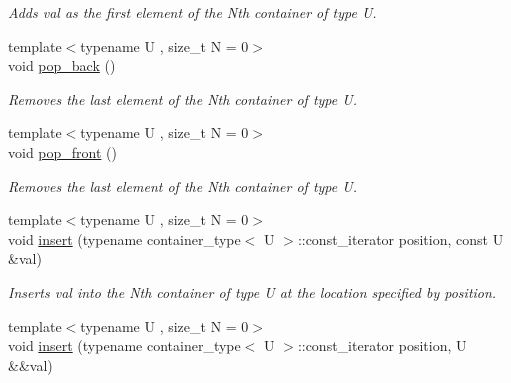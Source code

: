 \begin{DoxyCompactItemize}
\begin{DoxyCompactList}\small\item\em Adds val as the first element of the Nth container of type U. \end{DoxyCompactList}\item 
\hypertarget{classheterogeneous_1_1heterolist_3_01_t_00_01_types_8_8_8_4_aa08710185e3762e68d330735b3f35ae5}{}{\footnotesize template$<$typename U , size\+\_\+t N = 0$>$ }\\void \hyperlink{classheterogeneous_1_1heterolist_3_01_t_00_01_types_8_8_8_4_aa08710185e3762e68d330735b3f35ae5}{pop\+\_\+back} ()\label{classheterogeneous_1_1heterolist_3_01_t_00_01_types_8_8_8_4_aa08710185e3762e68d330735b3f35ae5}

\begin{DoxyCompactList}\small\item\em Removes the last element of the Nth container of type U. \end{DoxyCompactList}\item 
\hypertarget{classheterogeneous_1_1heterolist_3_01_t_00_01_types_8_8_8_4_a237f3d83ea3ac5a1bd5dcedbd2d6f789}{}{\footnotesize template$<$typename U , size\+\_\+t N = 0$>$ }\\void \hyperlink{classheterogeneous_1_1heterolist_3_01_t_00_01_types_8_8_8_4_a237f3d83ea3ac5a1bd5dcedbd2d6f789}{pop\+\_\+front} ()\label{classheterogeneous_1_1heterolist_3_01_t_00_01_types_8_8_8_4_a237f3d83ea3ac5a1bd5dcedbd2d6f789}

\begin{DoxyCompactList}\small\item\em Removes the last element of the Nth container of type U. \end{DoxyCompactList}\item 
\hypertarget{classheterogeneous_1_1heterolist_3_01_t_00_01_types_8_8_8_4_a7cb358ece628bdb513c3e768ff1d1822}{}{\footnotesize template$<$typename U , size\+\_\+t N = 0$>$ }\\void \hyperlink{classheterogeneous_1_1heterolist_3_01_t_00_01_types_8_8_8_4_a7cb358ece628bdb513c3e768ff1d1822}{insert} (typename container\+\_\+type$<$ U $>$\+::const\+\_\+iterator position, const U \&val)\label{classheterogeneous_1_1heterolist_3_01_t_00_01_types_8_8_8_4_a7cb358ece628bdb513c3e768ff1d1822}

\begin{DoxyCompactList}\small\item\em Inserts val into the Nth container of type U at the location specified by position. \end{DoxyCompactList}\item 
\hypertarget{classheterogeneous_1_1heterolist_3_01_t_00_01_types_8_8_8_4_abffd0f84e0855b83c8272335e6267511}{}{\footnotesize template$<$typename U , size\+\_\+t N = 0$>$ }\\void \hyperlink{classheterogeneous_1_1heterolist_3_01_t_00_01_types_8_8_8_4_abffd0f84e0855b83c8272335e6267511}{insert} (typename container\+\_\+type$<$ U $>$\+::const\+\_\+iterator position, U \&\&val)\label{classheterogeneous_1_1heterolist_3_01_t_00_01_types_8_8_8_4_abffd0f84e0855b83c8272335e6267511}


\end{DoxyCompactItemize}
